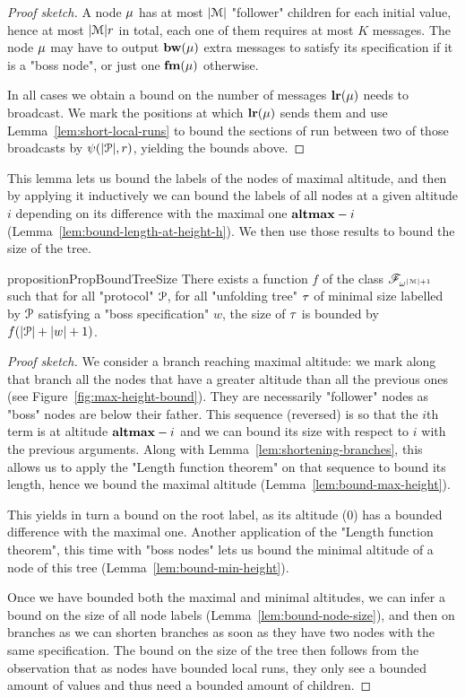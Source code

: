 \begin{proof}[Proof sketch]
	A node $\mu$ has at most $|\mathcal{M}|$ "follower" children for each initial value, hence at most $|\mathcal{M}|r$ in total, each one of them requires at most $K$ messages. The node $\mu$ may have to output $\mathbf{bw}(\mu)$ extra messages to satisfy its specification if it is a "boss node", or just one $\mathbf{fm}(\mu)$ otherwise.
	
	In all cases we obtain a bound on the number of messages $\mathbf{lr}(\mu)$ needs to broadcast. We mark the positions at which $\mathbf{lr}(\mu)$ sends them and use Lemma~\ref{lem:short-local-runs} to bound the sections of run between two of those broadcasts by $\psi(|\mathcal{P}|,r)$, yielding the bounds above.
\end{proof}

This lemma lets us bound the labels of the nodes of maximal altitude, and then by applying it inductively we can bound the labels of all nodes at a given altitude $i$ depending on its difference with the maximal one $\mathbf{altmax}-i$ (Lemma~\ref{lem:bound-length-at-height-h}). We then use those results to bound the size of the tree.

 
\begin{restatable}{proposition}{PropBoundTreeSize}
	\label{prop:bound-tree-size}
	There exists a function $f$ of the class $\mathscr{F}_{\omega^{|\mathcal{M}|+1}}$ such that for all "protocol" $\mathcal{P}$, for all "unfolding tree" $\tau$ of minimal size labelled by $\mathcal{P}$ satisfying a "boss specification" $w$, the size of $\tau$ is bounded by $f(|\mathcal{P}| + |w|+1)$.
\end{restatable}

\begin{proof}[Proof sketch]
	We consider a branch reaching maximal altitude: we mark along that branch all the nodes that have a greater altitude than all the previous ones (see Figure~\ref{fig:max-height-bound}). They are necessarily "follower" nodes as "boss" nodes are below their father. This sequence (reversed) is so that the $i$th term is at altitude $\mathbf{altmax}-i$ and we can bound its size with respect to $i$ with the previous arguments. Along with Lemma~\ref{lem:shortening-branches}, this allows us to apply the "Length function theorem" on that sequence to bound its length, hence we bound the maximal altitude (Lemma~\ref{lem:bound-max-height}).
	
	This yields in turn a bound on the root label, as its altitude ($0$) has a bounded difference with the maximal one. Another application of the "Length function theorem", this time with "boss nodes" lets us bound the minimal altitude of a node of this tree (Lemma~\ref{lem:bound-min-height}).
	
	Once we have bounded both the maximal and minimal altitudes, we can infer a bound on the size of all node labels (Lemma~\ref{lem:bound-node-size}), and then on branches as we can shorten branches as soon as they have two nodes with the same specification.
	The bound on the size of the tree then follows from the observation that as nodes have bounded local runs, they only see a bounded amount of values and thus need a bounded amount of children.
\end{proof}


